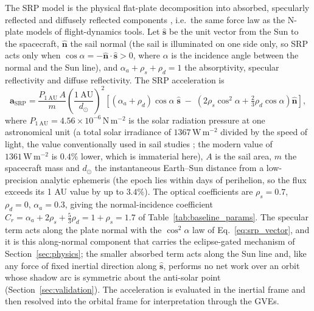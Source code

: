 \par\noindent The SRP model is the physical flat-plate decomposition into absorbed, specularly reflected and diffusely reflected components \citep{mcinnes1999,montenbruckGill2000,mcmahonSchereesSRP2010}, i.e.\ the same force law as the N-plate models of flight-dynamics tools. Let \(\hat{\mathbf{s}}\) be the unit vector from the Sun to the spacecraft, \(\hat{\mathbf{n}}\) the sail normal (the sail is illuminated on one side only, so SRP acts only when \(\cos\alpha = -\hat{\mathbf{n}}\cdot\hat{\mathbf{s}} > 0\), where \(\alpha\) is the incidence angle between the normal and the Sun line), and \(\alpha_a + \rho_s + \rho_d = 1\) the absorptivity, specular reflectivity and diffuse reflectivity. The SRP acceleration is
\begin{equation}
    \mathbf{a}_{\text{SRP}} = \frac{P_{1\ \text{AU}} \, A}{m}\left(\frac{1\ \text{AU}}{d_{\odot}}\right)^{2}
    \left[ (\alpha_a + \rho_d)\cos\alpha\;\hat{\mathbf{s}}
    \;-\;\left(2\rho_s\cos^{2}\alpha + \tfrac{2}{3}\rho_d\cos\alpha\right)\hat{\mathbf{n}} \right],
    \label{eq:srp_force}
\end{equation}
where \(P_{1\ \text{AU}} = 4.56\times10^{-6}\,\mathrm{N\,m^{-2}}\) is the solar radiation pressure at one astronomical unit (a total solar irradiance of \(1367\,\mathrm{W\,m^{-2}}\) divided by the speed of light, the value conventionally used in sail studies \citep{mcinnes1999}; the modern value of \(1361\,\mathrm{W\,m^{-2}}\) \citep{kopp2011solar} is \(0.4\%\) lower, which is immaterial here), \(A\) is the sail area, \(m\) the spacecraft mass and \(d_{\odot}\) the instantaneous Earth--Sun distance from a low-precision analytic ephemeris (the epoch lies within days of perihelion, so the flux exceeds its 1 AU value by up to \(3.4\%\)). The optical coefficients are \(\rho_s = 0.7\), \(\rho_d = 0\), \(\alpha_a = 0.3\), giving the normal-incidence coefficient \(C_{r} = \alpha_a + 2\rho_s + \tfrac{5}{3}\rho_d = 1 + \rho_s = 1.7\) of Table~\ref{tab:baseline_params}. The specular term acts along the plate normal with the \(\cos^{2}\alpha\) law of Eq.~\eqref{eq:srp_vector}, and it is this along-normal component that carries the eclipse-gated mechanism of Section~\ref{sec:physics}; the smaller absorbed term acts along the Sun line and, like any force of fixed inertial direction along \(\hat{\mathbf{s}}\), performs no net work over an orbit whose shadow arc is symmetric about the anti-solar point (Section~\ref{sec:validation}). The acceleration is evaluated in the inertial frame and then resolved into the orbital frame for interpretation through the GVEs.

